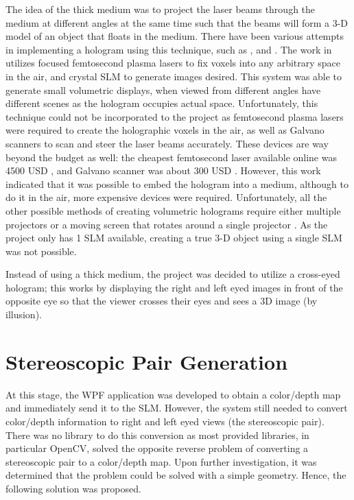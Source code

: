 \documentclass[12pt]{article}
\begin{document}
The idea of the thick medium was to project the laser beams through the medium at different angles at the same time such that the beams will form a 3-D model of an object that floats in the medium. There have been various attempts in implementing a hologram using this technique, such as \cite{ochiai2015fairy}, and \cite{sano2017holography}. The work in \cite{ochiai2015fairy} utilizes focused femtosecond plasma lasers to fix voxels into any arbitrary space in the air, and crystal SLM to generate images desired. This system was able to generate small volumetric displays, when viewed from different angles have different scenes as the hologram occupies actual space. Unfortunately, this technique could not be incorporated to the project as femtosecond plasma lasers were required to create the holographic voxels in the air, as well as Galvano scanners to scan and steer the laser beams accurately. These devices are way beyond the budget as well: the cheapest femtosecond laser available online was 4500 USD \cite{Femto}, and Galvano scanner was about 300 USD \cite{Galvano}. However, this work indicated that it was possible to embed the hologram into a medium, although to do it in the air, more expensive devices were required. Unfortunately, all the other possible methods of creating volumetric holograms require either multiple projectors or a moving screen that rotates around a single projector \cite{sano2017holography}. As the project only has 1 SLM available, creating a true 3-D object using a single SLM was not possible.

Instead of using a thick medium, the project was decided to utilize a cross-eyed hologram; this works by displaying the right and left eyed images in front of the opposite eye so that the viewer crosses their eyes and sees a 3D image (by illusion).

\newpage
\section{Stereoscopic Pair Generation}

At this stage, the WPF application was developed to obtain a color/depth map and immediately send it to the SLM. However, the system still needed to convert color/depth information to right and left eyed views (the stereoscopic pair). There was no library to do this conversion as most provided libraries, in particular OpenCV, solved the opposite reverse problem of converting a stereoscopic pair to a color/depth map. Upon further investigation, it was determined that the problem could be solved with a simple geometry. Hence, the following solution was proposed.
\end{document}
